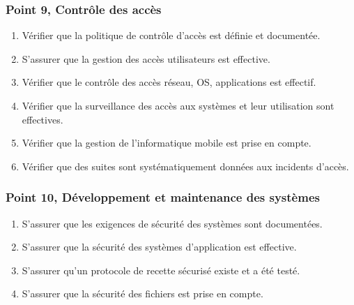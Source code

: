 \subsubsection{Point 9, Contrôle des accès}
\begin{enumerate}[label=9.\arabic*.]
    \item Vérifier que la politique de contrôle d'accès est définie et documentée.
    \item S'assurer que la gestion des accès utilisateurs est effective.
    \item Vérifier que le contrôle des accès réseau, OS, applications est effectif.
    \item Vérifier que la surveillance des accès aux systèmes et leur utilisation sont effectives.
    \item Vérifier que la gestion de l'informatique mobile est prise en compte.
    \item Vérifier que des suites sont systématiquement données aux incidents d'accès.
\end{enumerate}

\subsubsection{Point 10, Développement et maintenance des systèmes}
\begin{enumerate}[label=10.\arabic*.]
    \item S'assurer que les exigences de sécurité des systèmes sont documentées.
    \item S'assurer que la sécurité des systèmes d'application est effective.
    \item S'assurer qu'un protocole de recette sécurisé existe et a été testé.
    \item S'assurer que la sécurité des fichiers est prise en compte.
\end{enumerate}

